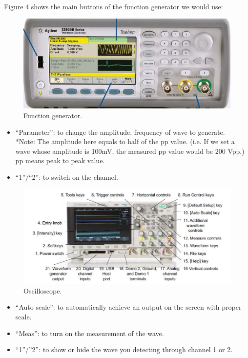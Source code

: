 \documentclass[a4paper]{report}
\begin{document}
	Figure 4 shows the main buttons of the function generator we would use:
	\begin{figure}[H]
		\centering
		\includegraphics[width=1\linewidth]{4.jpg}
		\caption{Function generator.}
	\end{figure}
	\begin{itemize}
		\item “Parameter”: to change the amplitude, frequency of wave to generate.\\*Note: The amplitude here equals to half of the pp value. (i.e. If we set a wave whose amplitude is 100mV, the measured pp value would be 200 Vpp.) pp means peak to peak value.
		\item “1”/“2”: to switch on the channel.
	\end{itemize}
	\begin{figure}[H]
		\centering
		\includegraphics[width=1\linewidth]{5.jpg}
		\caption{Oscilloscope.}
	\end{figure}
	\begin{itemize}
		\item “Auto scale”: to automatically achieve an output on the screen with proper scale.
		\item “Meas”: to turn on the measurement of the wave.
		\item “1”/”2”: to show or hide the wave you detecting through channel 1 or 2.
	\end{itemize}
\end{document}
